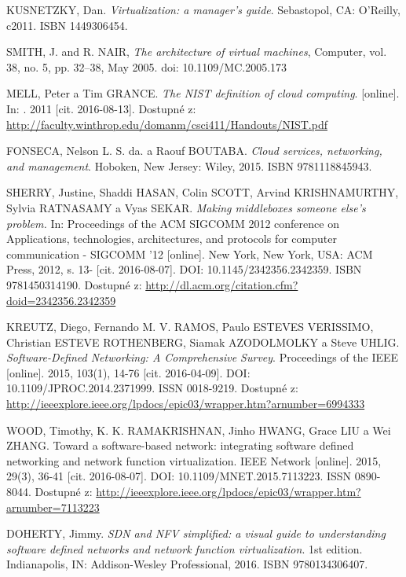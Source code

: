 \begin{thebibliography}{10}
KUSNETZKY, Dan. \emph{Virtualization: a manager's guide}. Sebastopol, CA: O'Reilly, c2011. ISBN 1449306454.

SMITH, J. and R. NAIR, \emph{The architecture of virtual machines}, Computer, vol. 38, no. 5, pp. 32–38, May 2005. doi: 10.1109/MC.2005.173

MELL, Peter a Tim GRANCE. \emph{The NIST definition of cloud computing}. [online]. In: . 2011 [cit. 2016-08-13]. Dostupné z: \url{http://faculty.winthrop.edu/domanm/csci411/Handouts/NIST.pdf}

FONSECA, Nelson L. S. da. a Raouf BOUTABA. \emph{Cloud services, networking, and management}. Hoboken, New Jersey: Wiley, 2015. ISBN 9781118845943.

SHERRY, Justine, Shaddi HASAN, Colin SCOTT, Arvind KRISHNAMURTHY, Sylvia RATNASAMY a Vyas SEKAR. \emph{Making middleboxes someone else's problem.} In: Proceedings of the ACM SIGCOMM 2012 conference on Applications, technologies, architectures, and protocols for computer communication - SIGCOMM '12 [online]. New York, New York, USA: ACM Press, 2012, s. 13- [cit. 2016-08-07]. DOI: 10.1145/2342356.2342359. ISBN 9781450314190. Dostupné z: \url{http://dl.acm.org/citation.cfm?doid=2342356.2342359}

KREUTZ, Diego, Fernando M. V. RAMOS, Paulo ESTEVES VERISSIMO, Christian ESTEVE ROTHENBERG, Siamak AZODOLMOLKY a Steve UHLIG. \emph{Software-Defined Networking: A Comprehensive Survey}. Proceedings of the IEEE [online]. 2015, 103(1), 14-76 [cit. 2016-04-09]. DOI: 10.1109/JPROC.2014.2371999. ISSN 0018-9219. Dostupné z: \url{http://ieeexplore.ieee.org/lpdocs/epic03/wrapper.htm?arnumber=6994333}

WOOD, Timothy, K. K. RAMAKRISHNAN, Jinho HWANG, Grace LIU a Wei ZHANG. Toward a software-based network: integrating software defined networking and network function virtualization. IEEE Network [online]. 2015, 29(3), 36-41 [cit. 2016-08-07]. DOI: 10.1109/MNET.2015.7113223. ISSN 0890-8044. Dostupné z: \url{http://ieeexplore.ieee.org/lpdocs/epic03/wrapper.htm?arnumber=7113223}

 DOHERTY, Jimmy. \emph{SDN and NFV simplified: a visual guide to understanding software defined networks and network function virtualization}. 1st edition. Indianapolis, IN: Addison-Wesley Professional, 2016. ISBN 9780134306407.



\end{thebibliography}
